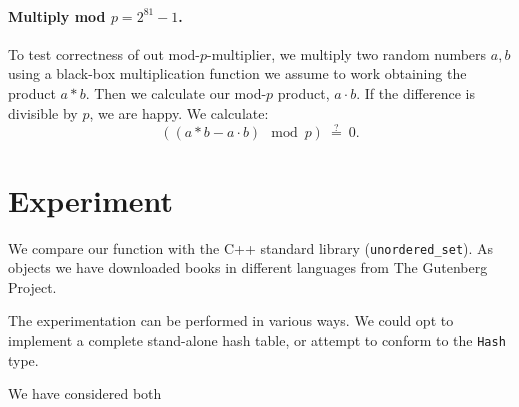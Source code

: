 \documentclass[]{article}
\newcommand{\funk}[1]{\small\texttt{#1}}
\newcommand{\cpp}{C+\!+\xspace}
\begin{document}
\paragraph{Multiply mod $p = 2^{81} -1$.} To test correctness of out mod-$p$-multiplier, we multiply two random numbers $a,b$ using a black-box multiplication function we assume to work obtaining the product $a*b$. Then we calculate our mod-$p$ product, $a\cdot b$. If the difference is divisible by $p$, we are happy. We calculate: 
$$\left((a*b - a\cdot b)\mod p\right) ~ \stackrel{?}{=} ~ 0.$$


\section{Experiment}
We compare our function with the \cpp standard library (\funk{unordered\_set}). As objects we have downloaded books in different languages from The Gutenberg Project.

The experimentation can be performed in various ways. We could opt to implement a complete stand-alone hash table, or attempt to conform to the \funk{Hash} type.

We have considered both
\end{document}

